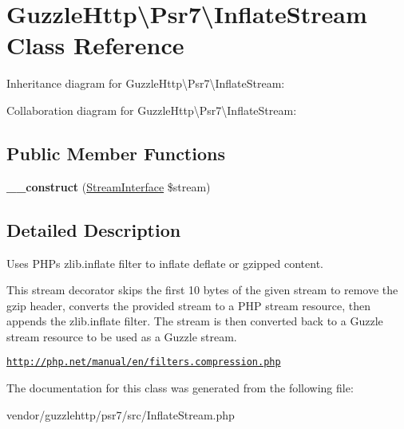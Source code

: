 \hypertarget{classGuzzleHttp_1_1Psr7_1_1InflateStream}{}\section{Guzzle\+Http\textbackslash{}Psr7\textbackslash{}Inflate\+Stream Class Reference}
\label{classGuzzleHttp_1_1Psr7_1_1InflateStream}


Inheritance diagram for Guzzle\+Http\textbackslash{}Psr7\textbackslash{}Inflate\+Stream\+:


Collaboration diagram for Guzzle\+Http\textbackslash{}Psr7\textbackslash{}Inflate\+Stream\+:
\subsection*{Public Member Functions}
\begin{DoxyCompactItemize}
\item 
\mbox{\label{classGuzzleHttp_1_1Psr7_1_1InflateStream_a06a51bed07c69de59ee68f78dcc817ff}} 
{\bfseries \+\_\+\+\_\+construct} (\hyperlink{interfacePsr_1_1Http_1_1Message_1_1StreamInterface}{Stream\+Interface} \$stream)
\end{DoxyCompactItemize}


\subsection{Detailed Description}
Uses P\+HP\textquotesingle{}s zlib.\+inflate filter to inflate deflate or gzipped content.

This stream decorator skips the first 10 bytes of the given stream to remove the gzip header, converts the provided stream to a P\+HP stream resource, then appends the zlib.\+inflate filter. The stream is then converted back to a Guzzle stream resource to be used as a Guzzle stream.

\hyperlink{}{\href{http://php.net/manual/en/filters.compression.php}{\tt http\+://php.\+net/manual/en/filters.\+compression.\+php} }

The documentation for this class was generated from the following file\+:\begin{DoxyCompactItemize}
\item 
vendor/guzzlehttp/psr7/src/Inflate\+Stream.\+php\end{DoxyCompactItemize}
